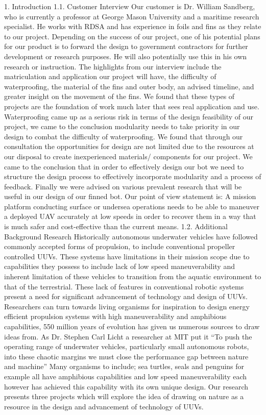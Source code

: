     1. Introduction
        1.1. Customer Interview
Our customer is Dr. William Sandberg, who is currently a professor at George Mason University and a maritime research specialist. He works with RDSA and has experience in foils and fins as they relate to our project. Depending on the success of our project, one of his potential plans for our product is to forward the design to government contractors for further development or research purposes. He will also potentially use this in his own research or instruction. The highlights from our interview include the matriculation and application our project will have, the difficulty of waterproofing, the material of the fins and outer body, an advised timeline, and greater insight on the movement of the fins. We found that these types of projects are the foundation of work much later that sees real application and use. Waterproofing came up as a serious risk in terms of the design feasibility of our project, we came to the conclusion modularity needs to take priority in our design to combat the difficulty of waterproofing. We found that through our consultation the opportunities for design are not limited due to the resources at our disposal to create inexperienced materials/ components for our project. We came to the conclusion that in order to effectively design our bot we need to structure the design process to effectively incorporate modularity and a process of feedback. Finally we were advised on various prevalent research that will be useful in our design of our finned bot. Our point of view statement is: A mission platform conducting surface or undersea operations needs to be able to maneuver a deployed UAV accurately at low speeds in order to recover them in a way that is much safer and cost-effective than the current means. 
        1.2. Additional Background Research
Historically autonomous underwater vehicles have followed commonly accepted forms of propulsion, to include conventional propeller controlled UUVs. These systems have limitations in their mission scope due to capabilities they possess to include lack of low speed maneuverability and inherent limitation of these vehicles to transition from the aquatic environment to that of the terrestrial. These lack of features in conventional robotic systems present a need for significant advancement of technology and design of UUVs. Researchers can turn towards living organisms for inspiration to design energy efficient propulsion systems with high maneuverability and amphibious capabilities, 550 million years of evolution has given us numerous sources to draw ideas from. As Dr. Stephen Carl Licht a researcher at MIT put it “To push the operating range of underwater vehicles, particularly small autonomous robots, into these chaotic margins we must close the performance gap between nature and machine” Many organisms to include; sea turtles, seals and penguins for example all have amphibious capabilities and low speed maneuverability each however has achieved this capability with its own unique design. Our research presents three projects which will explore the idea of drawing on nature as a resource in the design and advancement of technology of UUVs. 
